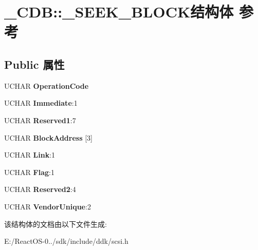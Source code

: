 \hypertarget{struct___c_d_b_1_1___s_e_e_k___b_l_o_c_k}{}\section{\+\_\+\+C\+DB\+:\+:\+\_\+\+S\+E\+E\+K\+\_\+\+B\+L\+O\+C\+K结构体 参考}
\label{struct___c_d_b_1_1___s_e_e_k___b_l_o_c_k}
\subsection*{Public 属性}
\begin{DoxyCompactItemize}
\item 
\mbox{\label{struct___c_d_b_1_1___s_e_e_k___b_l_o_c_k_a73d0b7a788c5052420e407087fddcac0}} 
U\+C\+H\+AR {\bfseries Operation\+Code}
\item 
\mbox{\label{struct___c_d_b_1_1___s_e_e_k___b_l_o_c_k_a27ada4e9e1f99995ad374373a0a59e23}} 
U\+C\+H\+AR {\bfseries Immediate}\+:1
\item 
\mbox{\label{struct___c_d_b_1_1___s_e_e_k___b_l_o_c_k_ad07347402de8dac5edb3df6d018b84f5}} 
U\+C\+H\+AR {\bfseries Reserved1}\+:7
\item 
\mbox{\label{struct___c_d_b_1_1___s_e_e_k___b_l_o_c_k_a4600426c0bda44e133d77724a07bae82}} 
U\+C\+H\+AR {\bfseries Block\+Address} \mbox{[}3\mbox{]}
\item 
\mbox{\label{struct___c_d_b_1_1___s_e_e_k___b_l_o_c_k_a00fd61e08e0e44f7890d38064517f5d5}} 
U\+C\+H\+AR {\bfseries Link}\+:1
\item 
\mbox{\label{struct___c_d_b_1_1___s_e_e_k___b_l_o_c_k_a367f0d89deed0f5f7221e251f1c39052}} 
U\+C\+H\+AR {\bfseries Flag}\+:1
\item 
\mbox{\label{struct___c_d_b_1_1___s_e_e_k___b_l_o_c_k_acb765278a77f36947242bb0e95164a25}} 
U\+C\+H\+AR {\bfseries Reserved2}\+:4
\item 
\mbox{\label{struct___c_d_b_1_1___s_e_e_k___b_l_o_c_k_a680f69c0ebd7af67ecd8c8ac42dd9b3b}} 
U\+C\+H\+AR {\bfseries Vendor\+Unique}\+:2
\end{DoxyCompactItemize}


该结构体的文档由以下文件生成\+:\begin{DoxyCompactItemize}
\item 
E\+:/\+React\+O\+S-\/0../sdk/include/ddk/scsi.\+h\end{DoxyCompactItemize}
